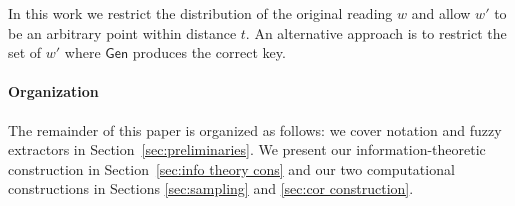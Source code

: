 \documentclass[11pt]{article}
\newcommand{\secref}[1]{\mbox{Section~\ref{#1}}}
\newcommand{\class}[1]{{\ensuremath{\mathsf{#1}}}}
\newcommand{\gen}{\ensuremath{\class{Gen}}\xspace}
\newcommand{\Huse}{\mathrm{H}_{\mathtt{usable}}}
\newcommand{\authnote}[2]{{\textcolor{red}{\textsf{#1 notes: }\textcolor{blue}{ #2}}\marginpar{\textcolor{red}{\textbf{!!!!!}}}}}
\newcommand{\authnote}[2]{}
\newcommand{\bnote}[1]{{\authnote{Ben}{#1}}}
\begin{document}


In this work we restrict the distribution of the original reading $w$ and allow $w'$ to be an arbitrary point within distance $t$.  An alternative approach is to restrict the set of $w'$ where $\gen$ produces the correct key.%

\medskip
\paragraph{Organization }
The remainder of this paper is organized as follows: we cover notation and fuzzy extractors in \secref{sec:preliminaries}.  We present our information-theoretic construction in \secref{sec:info theory cons} and our two computational constructions in Sections \ref{sec:sampling} and \ref{sec:cor construction}.
\end{document}

